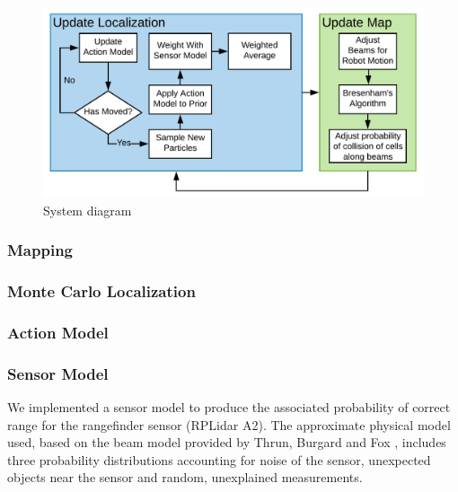 \documentclass[journal]{IEEEtran}
\begin{document}
        \begin{figure}[b]
            \centering
            \includegraphics[width=1\linewidth]{slam.pdf}
            \caption{System diagram}
            \label{fig:sys}
        \end{figure}
    
        \subsubsection{Mapping}
        
        \subsubsection{Monte Carlo Localization}
        
        \subsubsection{Action Model}
            
            
            
            
            
            
        
         \subsubsection{Sensor Model}
         
            We implemented a sensor model to produce the associated probability of correct range for the rangefinder sensor (RPLidar A2). The approximate physical model used, based on the beam model provided by Thrun, Burgard and Fox \cite{Prob_Rob}, includes three probability distributions accounting for noise of the sensor, unexpected objects near the sensor and random, unexplained measurements.
            
\end{document}
